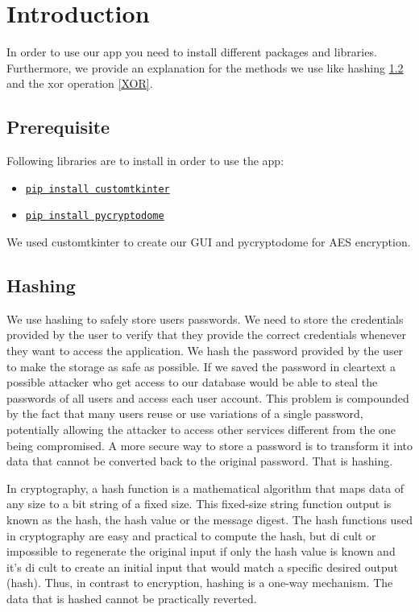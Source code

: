\documentclass[]{article}
\begin{document}
\tableofcontents
\newpage

\section{Introduction}
In order to use our app you need to install different packages and libraries. Furthermore, we provide
an explanation for the methods we use like hashing \ref{hash} and the xor operation \ref{XOR}.

\subsection{Prerequisite}
Following libraries are to install in order to use the app:
\begin{itemize}
    \item \href{https://pypi.org/project/customtkinter/}{\texttt{pip install customtkinter}}
    \item \href{https://pypi.org/project/pycryptodome/}{\texttt{pip install pycryptodome}}
\end{itemize}
We used customtkinter to create our GUI \cite{TomSchim}\cite{pythonhub}\cite{pytutorial} and pycryptodome 
for AES encryption. \cite{onboard}\cite{nitratine}\cite{pycrypto}

\subsection{Hashing} \label{hash}
We use hashing to safely store users passwords. We need to store the credentials provided by the user 
to verify that they provide the correct credentials whenever they want to access the application. We hash 
the password provided by the user to make the storage as safe as possible. If we saved the password in cleartext 
a possible attacker who get access to our database would be able to steal the passwords of all users and access 
each user account. This problem is compounded by the fact that many users reuse or use variations of a single 
password, potentially allowing the attacker to access other services different from the one being compromised. 
A more secure way to store a password is to transform it into data that cannot be converted back to the original 
password. That is hashing. 

In cryptography, a hash function is a mathematical algorithm that maps data
of any size to a bit string of a fixed size. This fixed-size string function output is known as the 
hash, the hash value or the message digest. The hash functions used in cryptography are easy and 
practical to compute the hash, but di cult or impossible to regenerate the original input if only the hash 
value is known and it's di cult to create an initial input that would match a specific desired output (hash). 
Thus, in contrast to encryption, hashing is a one-way mechanism. The data that is hashed cannot be practically 
reverted. 
\end{document}
